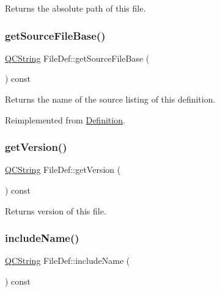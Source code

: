 Returns the absolute path of this file. \mbox{\label{class_file_def_a9ddb22ec1cbae4e2b8d192c455103046}} 
\subsubsection{\texorpdfstring{getSourceFileBase()}{getSourceFileBase()}}
{\footnotesize\ttfamily \mbox{\hyperlink{class_q_c_string}{Q\+C\+String}} File\+Def\+::get\+Source\+File\+Base (\begin{DoxyParamCaption}{ }\end{DoxyParamCaption}) const\hspace{0.3cm}{\ttfamily [virtual]}}

Returns the name of the source listing of this definition. 

Reimplemented from \mbox{\hyperlink{class_definition_abdb114d4da6048e834ccae02393790df}{Definition}}.

\mbox{\label{class_file_def_a8f8cd8aec9c308358c7e9e747757e3cc}} 
\subsubsection{\texorpdfstring{getVersion()}{getVersion()}}
{\footnotesize\ttfamily \mbox{\hyperlink{class_q_c_string}{Q\+C\+String}} File\+Def\+::get\+Version (\begin{DoxyParamCaption}{ }\end{DoxyParamCaption}) const\hspace{0.3cm}{\ttfamily [inline]}}

Returns version of this file. \mbox{\label{class_file_def_a2520150a3fdcd1fc4ed3cefa31d146f5}} 
\subsubsection{\texorpdfstring{includeName()}{includeName()}}
{\footnotesize\ttfamily \mbox{\hyperlink{class_q_c_string}{Q\+C\+String}} File\+Def\+::include\+Name (\begin{DoxyParamCaption}{ }\end{DoxyParamCaption}) const}

